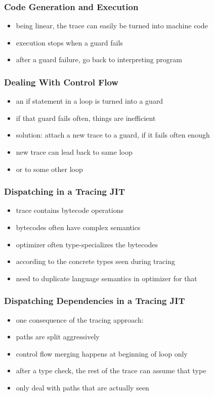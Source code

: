\documentclass[utf8x]{beamer}
\begin{document}
\begin{frame}
    \frametitle{Code Generation and Execution}
    \begin{itemize}
    \item being linear, the trace can easily be turned into machine code
    \item execution stops when a guard fails
    \item after a guard failure, go back to interpreting program
    \end{itemize}
\end{frame}

\begin{frame}
  \frametitle{Dealing With Control Flow}
  \begin{itemize}
      \item an if statement in a loop is turned into a guard
      \item if that guard fails often, things are inefficient
      \item solution: attach a new trace to a guard, if it fails often enough
      \item new trace can lead back to same loop
      \item or to some other loop
  \end{itemize}
\end{frame}


\begin{frame}
  \frametitle{Dispatching in a Tracing JIT}
  \begin{itemize}
      \item trace contains bytecode operations
      \item bytecodes often have complex semantics
      \item optimizer often type-specializes the bytecodes
      \item according to the concrete types seen during tracing
      \item need to duplicate language semantics in optimizer for that
  \end{itemize}
\end{frame}


\begin{frame}
  \frametitle{Dispatching Dependencies in a Tracing JIT}
  \begin{itemize}
      \item one consequence of the tracing approach:
      \item paths are split aggressively
      \item control flow merging happens at beginning of loop only
      \item after a type check, the rest of the trace can assume that type
      \item only deal with paths that are actually seen
  \end{itemize}
\end{frame}
\end{document}

